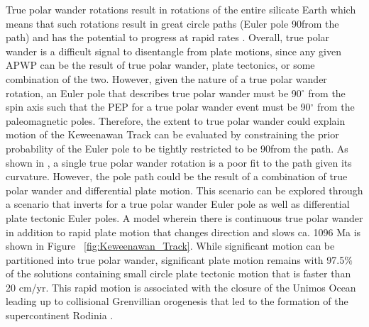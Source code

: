 \documentclass[11pt,letterpaper]{article}
\begin{document}
True polar wander rotations result in rotations of the entire silicate Earth which means that such rotations result in great circle paths (Euler pole 90\textdegree from the path) and has the potential to progress at rapid rates \citep{Rose2017b}. Overall, true polar wander is a difficult signal to disentangle from plate motions, since any given APWP can be the result of true polar wander, plate tectonics, or some combination of the two. However, given the nature of a true polar wander rotation, an Euler pole that describes true polar wander must be 90$^\circ$ from the spin axis such that the PEP for a true polar wander event must be 90$^\circ$ from the paleomagnetic poles. Therefore, the extent to true polar wander could explain motion of the Keweenawan Track can be evaluated by constraining the prior probability of the Euler pole to be tightly restricted to be 90\textdegree from the path. As shown in \citet{Swanson-Hysell2019a}, a single true polar wander rotation is a poor fit to the path given its curvature. However, the pole path could be the result of a combination of true polar wander and differential plate motion. This scenario can be explored through a scenario that inverts for a true polar wander Euler pole as well as differential plate tectonic Euler poles. A model wherein there is continuous true polar wander in addition to rapid plate motion that changes direction and slows ca. 1096 Ma is shown in Figure ~\ref{fig:Keweenawan_Track}. While significant motion can be partitioned into true polar wander, significant plate motion remains with 97.5$\%$ of the solutions containing small circle plate tectonic motion that is faster than 20 cm/yr. This rapid motion is associated with the closure of the Unimos Ocean leading up to collisional Grenvillian orogenesis that led to the formation of the supercontinent Rodinia \citep{Swanson-Hysell2021d}.

\end{document}

